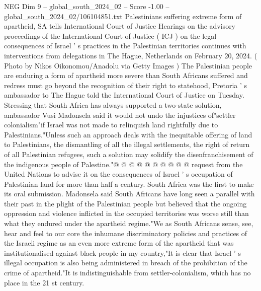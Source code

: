 \begin{textsample}{NEG Dim 9 – global\_south\_2024\_02 – Score -1.00 – global\_south\_2024\_02/106104851.txt}  \label{ex:f9_neg_356}
Palestinians suffering extreme form of apartheid, SA tells International Court of Justice Hearings on the advisory proceedings of the International Court of Justice ( ICJ ) on the legal consequences of Israel ' s practices in the Palestinian territories continues with interventions from delegations in The Hague, Netherlands on February 20, 2024. ( Photo by Nikos Oikonomou/Anadolu via Getty Images ) The Palestinian people are enduring a form of apartheid more severe than South Africans suffered and redress must go beyond the recognition of their right to statehood, Pretoria ' s ambassador to The Hague told the International Court of Justice on Tuesday.
Stressing that South Africa has always supported a two-state solution, ambassador Vusi Madonsela said it would not undo the injustices of"settler colonialism"if Israel was not made to relinquish land rightfully due to Palestinians."Unless such an approach deals with the inequitable offering of land to Palestinians, the dismantling of all the illegal settlements, the right of return of all Palestinian refugees, such a solution may solidify the disenfranchisement of the indigenous people of Palestine."@ @ @ @ @ @ @ @ @ @ request from the United Nations to advise it on the consequences of Israel ' s occupation of Palestinian land for more than half a century.
South Africa was the first to make its oral submission.
Madonsela said South Africans have long seen a parallel with their past in the plight of the Palestinian people but believed that the ongoing oppression and violence inflicted in the occupied territories was worse still than what they endured under the apartheid regime."We as South Africans sense, see, hear and feel to our core the inhumane discriminatory policies and practices of the Israeli regime as an even more extreme form of the apartheid that was institutionalised against black people in my country,"It is clear that Israel ' s illegal occupation is also being administered in breach of the prohibition of the crime of apartheid."It is indistinguishable from settler-colonialism, which has no place in the 21 st century.

\end{textsample}
